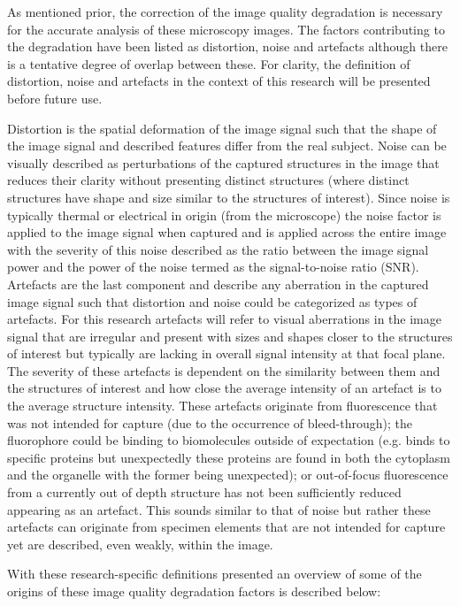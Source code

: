 As mentioned prior, the correction of the image quality degradation is necessary for the accurate analysis of these microscopy images. The factors contributing to the degradation have been listed as distortion, noise and artefacts although there is a tentative degree of overlap between these. For clarity, the definition of distortion, noise and artefacts in the context of this research will be presented before future use.\par Distortion is the spatial deformation of the image signal such that the shape of the image signal and described features differ from the real subject. Noise can be visually described as perturbations of the captured structures in the image that reduces their clarity without presenting distinct structures (where distinct structures have shape and size similar to the structures of interest). Since noise is typically thermal or electrical in origin (from the microscope) the noise factor is applied to the image signal when captured and is applied across the entire image with the severity of this noise described as the ratio between the image signal power and the power of the noise termed as the signal-to-noise ratio (SNR). Artefacts are the last component and describe any aberration in the captured image signal such that distortion and noise could be categorized as types of artefacts. For this research artefacts will refer to visual aberrations in the image signal that are irregular and present with sizes and shapes closer to the structures of interest but typically are lacking in overall signal intensity at that focal plane. The severity of these artefacts is dependent on the similarity between them and the structures of interest and how close the average intensity of an artefact is to the average structure intensity. These artefacts originate from fluorescence that was not intended for capture (due to the occurrence of bleed-through); the fluorophore could be binding to biomolecules outside of expectation (e.g. binds to specific proteins but unexpectedly these proteins are found in both the cytoplasm and the organelle with the former being unexpected); or out-of-focus fluorescence from a currently out of depth structure has not been sufficiently reduced appearing as an artefact. This sounds similar to that of noise but rather these artefacts can originate from specimen elements that are not intended for capture yet are described, even weakly, within the image.\par With these research-specific definitions presented an overview of some of the origins of these image quality degradation factors is described below: 

